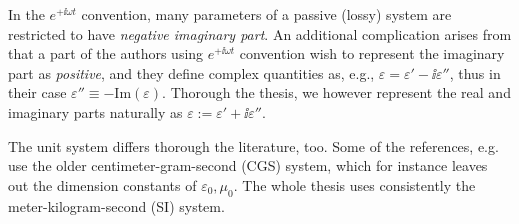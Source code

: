In the $e^{+\ii\omega t}$ convention, many parameters of a passive (lossy) system are restricted to have \textit{negative imaginary part}.  An additional complication arises from that a part of the authors using $e^{+\ii\omega t}$ convention wish to represent the imaginary part as \textit{positive}, and they define complex quantities as, e.g., $\varepsilon = \varepsilon' - \ii \varepsilon''$, %
thus in their case $\varepsilon''\equiv -\text{Im}(\varepsilon)$. Thorough the thesis, we however represent the real and imaginary parts naturally as $\varepsilon := \varepsilon' + \ii \varepsilon''$.

The unit system differs thorough the literature, too. Some of the references, e.g. \cite{landau1984electrodynamics, agranovich2006spatial, krowne2007book_agran} use the older centimeter-gram-second (CGS) system, which for instance leaves out the dimension constants of $\varepsilon_0, \mu_0$. The whole thesis uses consistently the meter-kilogram-second (SI) system.
